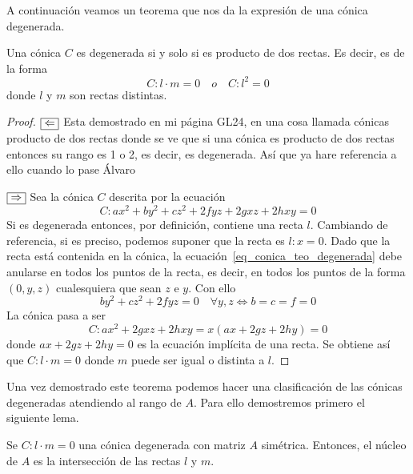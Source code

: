 A continuación veamos un teorema que nos da la expresión de una cónica degenerada.

\begin{theo}
	Una cónica $C$ es degenerada si y solo si es producto de dos rectas. Es decir, es de la forma
	\begin{equation}
	C:l\cdot m=0 \quad o \quad C:l^2=0
	\end{equation}
	donde $l$ y $m$ son rectas distintas.
\end{theo}

\begin{proof}
	$\fbox{$\Leftarrow$}$ Esta demostrado en mi página GL24, en una cosa llamada cónicas producto de dos rectas donde se ve que si una cónica es producto de dos rectas entonces su rango es 1 o 2, es decir, es degenerada. Así que ya hare referencia a ello cuando lo pase Álvaro
	
	$\fbox{$\Rightarrow$}$ Sea la cónica $C$ descrita por la ecuación
	\begin{equation}\label{eq_conica_teo_degenerada}
	C: ax^2+by^2+cz^2+2fyz+2gxz+2hxy=0
	\end{equation}
	Si es degenerada entonces, por definición, contiene una recta $l$. Cambiando de referencia, si es preciso, podemos suponer que la recta es $l:x=0$. Dado que la recta está contenida en la cónica, la ecuación~\eqref{eq_conica_teo_degenerada} debe anularse en todos los puntos de la recta, es decir, en todos los puntos de la forma $(0,y,z)$ cualesquiera que sean $z$ e $y$. Con ello
	\begin{equation}
	by^2+cz^2+2fyz=0 \quad \forall y,z \Leftrightarrow b=c=f=0
	\end{equation}
	La cónica pasa a ser
	\begin{equation}
	C: ax^2+2gxz+2hxy=x(ax+2gz+2hy)=0
	\end{equation}
	donde $ax+2gz+2hy=0$ es la ecuación implícita de una recta. Se obtiene así que $C:l\cdot m=0$ donde $m$ puede ser igual o distinta a $l$.
\end{proof}

Una vez demostrado este teorema podemos hacer una clasificación de las cónicas degeneradas atendiendo al rango de $A$. Para ello demostremos primero el siguiente lema.

\begin{lem}
	Se $C:l\cdot m=0$ una cónica degenerada con matriz $A$ simétrica. Entonces, el núcleo de $A$ es la intersección de las rectas $l$ y $m$.
\end{lem}

